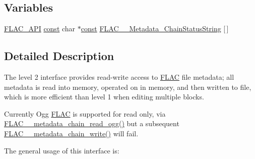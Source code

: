 \subsection*{Variables}
\begin{DoxyCompactItemize}
\item 
\hyperlink{group__flac__export_ga56ca07df8a23310707732b1c0007d6f5}{F\+L\+A\+C\+\_\+\+A\+PI} \hyperlink{getopt1_8c_a2c212835823e3c54a8ab6d95c652660e}{const} char $\ast$\hyperlink{getopt1_8c_a2c212835823e3c54a8ab6d95c652660e}{const} \hyperlink{group__flac__metadata__level2_gabb4646b4af36d17497676759767f8cc7}{F\+L\+A\+C\+\_\+\+\_\+\+Metadata\+\_\+\+Chain\+Status\+String} \mbox{[}$\,$\mbox{]}
\end{DoxyCompactItemize}


\subsection{Detailed Description}
The level 2 interface provides read-\/write access to \hyperlink{namespace_f_l_a_c}{F\+L\+AC} file metadata; all metadata is read into memory, operated on in memory, and then written to file, which is more efficient than level 1 when editing multiple blocks. 

Currently Ogg \hyperlink{namespace_f_l_a_c}{F\+L\+AC} is supported for read only, via \hyperlink{group__flac__metadata__level2_gae7b34f2929bedea0e14ac14aca253a40}{F\+L\+A\+C\+\_\+\+\_\+metadata\+\_\+chain\+\_\+read\+\_\+ogg()} but a subsequent \hyperlink{group__flac__metadata__level2_gaa15ead7230217de8e79f4af822cda490}{F\+L\+A\+C\+\_\+\+\_\+metadata\+\_\+chain\+\_\+write()} will fail.

The general usage of this interface is\+:


